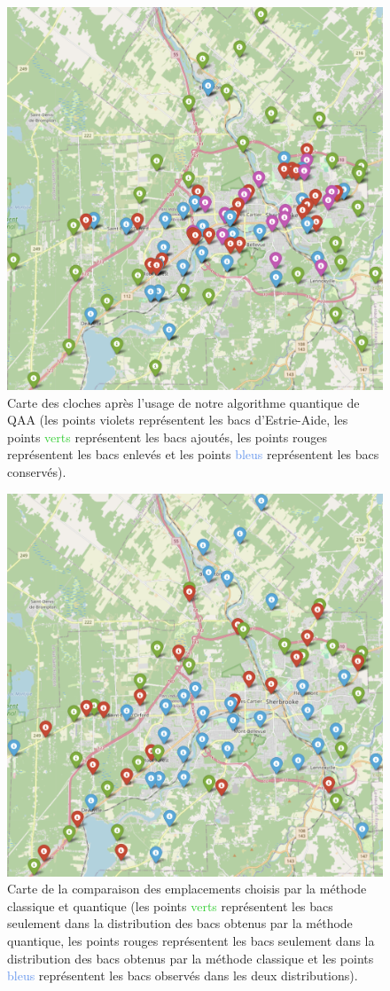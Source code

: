 \documentclass[11pt]{article}
\begin{document}
\begin{figure}[H]
    \centering
    \includegraphics[width=0.49\linewidth]{images/total_quantum.png}
    \caption{Carte des cloches après l'usage de notre algorithme quantique de QAA (les points \textcolor{Mulberry}{violets} représentent les bacs d'Estrie-Aide, les points \textcolor{LimeGreen}{verts} représentent les bacs ajoutés, les points \textcolor{BrickRed}{rouges} représentent les bacs enlevés et les points \textcolor{CornflowerBlue}{bleus} représentent les bacs conservés).
}
    \label{total}
\end{figure}

\begin{figure}[H]
    \centering
    \includegraphics[width=0.49\linewidth]{images/both_distributions.png}
    \caption{Carte de la comparaison des emplacements choisis par la méthode classique et quantique (les points \textcolor{LimeGreen}{verts} représentent les bacs seulement dans la distribution des bacs obtenus par la méthode quantique, les points \textcolor{BrickRed}{rouges} représentent les bacs seulement dans la distribution des bacs obtenus par la méthode classique et les points \textcolor{CornflowerBlue}{bleus} représentent les bacs observés dans les deux distributions).
}
    \label{bothdist}
\end{figure}
\end{document}
